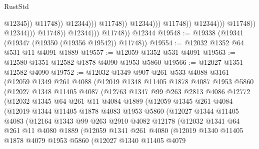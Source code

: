 \begin{lexlean}{RustStd}
\begin{coremodule}
                                                              @12345))
                                                          @11748))
                                                      @12344)))
                                                @11748))
                                            @12344)))
                                      @11748))
                                  @12344)))
                            @11748))
                        @12344)))
                  @11748))
              @12344)))
        @11748))
    @12344
@19548 := @19338 (@19341 (@19347 (@19350 (@19356 @19542)) @11748))
@19554 := @12032 @1352 @64 @531 @11 @4091 @1889
@19557 := @12059 @1352 @531 @4091
@19563 := @12580 @1351 @12582 @1878 @4090 @1953 @5860
@19566 := @12027 @1351 @12582 @4090
@19752 := @12032
    @1349
    @907
    @261
    @533
    @4088
    @3161
    (@12059
      @1349
      @261
      @4088
      (@12019
        @1348
        @11405
        @1878
        @4087
        @1953
        @5860
        (@12027
          @1348
          @11405
          @4087
          (@12763
            @1347
            @99
            @263
            @2813
            @4086
            @12772
            (@12032
              @1345
              @64
              @261
              @11
              @4084
              @1889
              (@12059
                @1345
                @261
                @4084
                (@12019
                  @1344
                  @11405
                  @1878
                  @4083
                  @1953
                  @5860
                  (@12027
                    @1344
                    @11405
                    @4083
                    (@12164
                      @1343
                      @99
                      @263
                      @2910
                      @4082
                      @12178
                      (@12032
                        @1341
                        @64
                        @261
                        @11
                        @4080
                        @1889
                        (@12059
                          @1341
                          @261
                          @4080
                          (@12019
                            @1340
                            @11405
                            @1878
                            @4079
                            @1953
                            @5860
                            (@12027
                              @1340
                              @11405
                              @4079

\end{coremodule}
\end{lexlean}
